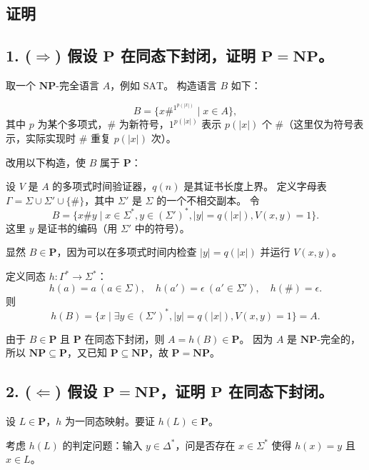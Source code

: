 \documentclass[11pt,addpoints,answers]{exam}
\begin{document}
\begin{questions}
\begin{solution}
    \section*{证明}
    
    \subsection*{1. ($\Rightarrow$) 假设 $\mathbf{P}$ 在同态下封闭，证明 $\mathbf{P} = \mathbf{NP}$。}
    
    取一个 $\mathbf{NP}$-完全语言 $A$，例如 $\mathrm{SAT}$。  
    构造语言 $B$ 如下：
    
    \[
    B = \{ x \#^{1^{p(|x|)}} \mid x \in A \},
    \]
    其中 $p$ 为某个多项式，$\#$ 为新符号，$1^{p(|x|)}$ 表示 $p(|x|)$ 个 $\#$（这里仅为符号表示，实际实现时 $\#$ 重复 $p(|x|)$ 次）。
    
    改用以下构造，使 $B$ 属于 $\mathbf{P}$：
    
    设 $V$ 是 $A$ 的多项式时间验证器，$q(n)$ 是其证书长度上界。  
    定义字母表 $\Gamma = \Sigma \cup \Sigma' \cup \{\#\}$，其中 $\Sigma'$ 是 $\Sigma$ 的一个不相交副本。  
    令
    \[
    B = \{ x \# y \mid x \in \Sigma^*, y \in (\Sigma')^*, |y| = q(|x|), V(x, y) = 1 \}.
    \]
    这里 $y$ 是证书的编码（用 $\Sigma'$ 中的符号）。
    
    显然 $B \in \mathbf{P}$，因为可以在多项式时间内检查 $|y| = q(|x|)$ 并运行 $V(x,y)$。
    
    定义同态 $h: \Gamma^* \to \Sigma^*$：
    \[
    h(a) = a \ (a \in \Sigma), \quad h(a') = \epsilon \ (a' \in \Sigma'), \quad h(\#) = \epsilon.
    \]
    则
    \[
    h(B) = \{ x \mid \exists y \in (\Sigma')^*, |y| = q(|x|), V(x,y)=1 \} = A.
    \]
    
    由于 $B \in \mathbf{P}$ 且 $\mathbf{P}$ 在同态下封闭，则 $A = h(B) \in \mathbf{P}$。  
    因为 $A$ 是 $\mathbf{NP}$-完全的，所以 $\mathbf{NP} \subseteq \mathbf{P}$，又已知 $\mathbf{P} \subseteq \mathbf{NP}$，故 $\mathbf{P} = \mathbf{NP}$。
    
    \subsection*{2. ($\Leftarrow$) 假设 $\mathbf{P} = \mathbf{NP}$，证明 $\mathbf{P}$ 在同态下封闭。}
    
    设 $L \in \mathbf{P}$，$h$ 为一同态映射。要证 $h(L) \in \mathbf{P}$。
    
    考虑 $h(L)$ 的判定问题：输入 $y \in \Delta^*$，问是否存在 $x \in \Sigma^*$ 使得 $h(x)=y$ 且 $x \in L$。
    

\end{solution}
\end{questions}
\end{document}
